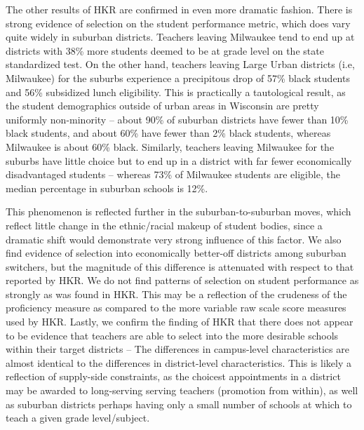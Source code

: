 \documentclass[12pt,]{article}
\begin{document}
The other results of HKR are confirmed in even more dramatic fashion.
There is strong evidence of selection on the student performance metric,
which does vary quite widely in suburban districts. Teachers leaving
Milwaukee tend to end up at districts with 38\% more students deemed to
be at grade level on the state standardized test. On the other hand,
teachers leaving Large Urban districts (i.e, Milwaukee) for the suburbs
experience a precipitous drop of 57\% black students and 56\% subsidized
lunch eligibility. This is practically a tautological result, as the
student demographics outside of urban areas in Wisconsin are pretty
uniformly non-minority -- about 90\% of suburban districts have fewer
than 10\% black students, and about 60\% have fewer than 2\% black
students, whereas Milwaukee is about 60\% black. Similarly, teachers
leaving Milwaukee for the suburbs have little choice but to end up in a
district with far fewer economically disadvantaged students -- whereas
73\% of Milwaukee students are eligible, the median percentage in
suburban schools is 12\%.

This phenomenon is reflected further in the suburban-to-suburban moves,
which reflect little change in the ethnic/racial makeup of student
bodies, since a dramatic shift would demonstrate very strong influence
of this factor. We also find evidence of selection into economically
better-off districts among suburban switchers, but the magnitude of this
difference is attenuated with respect to that reported by HKR. We do not
find patterns of selection on student performance as strongly as was
found in HKR. This may be a reflection of the crudeness of the
proficiency measure as compared to the more variable raw scale score
measures used by HKR. Lastly, we confirm the finding of HKR that there
does not appear to be evidence that teachers are able to select into the
more desirable schools within their target districts -- The differences
in campus-level characteristics are almost identical to the differences
in district-level characteristics. This is likely a reflection of
supply-side constraints, as the choicest appointments in a district may
be awarded to long-serving serving teachers (promotion from within), as
well as suburban districts perhaps having only a small number of schools
at which to teach a given grade level/subject.
\end{document}
